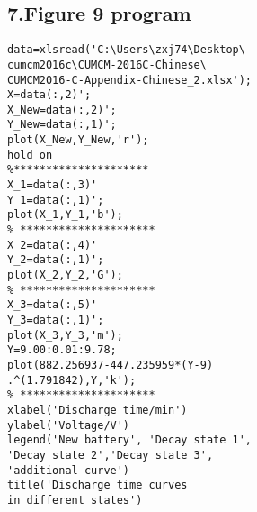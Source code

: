 \documentclass[conference]{IEEEtran}
\begin{document}
\subsection*{7.Figure 9 program}
\begin{lstlisting}
data=xlsread('C:\Users\zxj74\Desktop\
cumcm2016c\CUMCM-2016C-Chinese\
CUMCM2016-C-Appendix-Chinese_2.xlsx');
X=data(:,2)';
X_New=data(:,2)';
Y_New=data(:,1)';
plot(X_New,Y_New,'r');
hold on
%*********************
X_1=data(:,3)'
Y_1=data(:,1)';
plot(X_1,Y_1,'b');
% *********************
X_2=data(:,4)'
Y_2=data(:,1)';
plot(X_2,Y_2,'G');
% *********************
X_3=data(:,5)'
Y_3=data(:,1)';
plot(X_3,Y_3,'m');
Y=9.00:0.01:9.78;
plot(882.256937-447.235959*(Y-9)
.^(1.791842),Y,'k');
% *********************
xlabel('Discharge time/min')
ylabel('Voltage/V')
legend('New battery', 'Decay state 1',
'Decay state 2','Decay state 3',
'additional curve')
title('Discharge time curves 
in different states')
\end{lstlisting}
\end{document}
